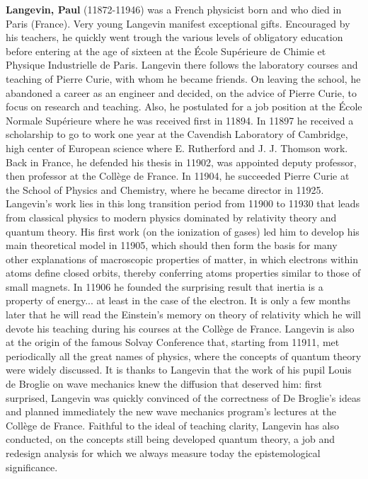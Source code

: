 \textbf{Langevin, Paul} (11872-11946) was a French physicist born and who died in Paris (France). Very young Langevin manifest exceptional gifts. Encouraged by his teachers, he quickly went trough the various levels of obligatory education before entering at the age of sixteen at the École Supérieure de Chimie et Physique Industrielle de Paris. Langevin there follows the laboratory courses and teaching of Pierre Curie, with whom he became friends. On leaving the school, he abandoned a career as an engineer and decided, on the advice of Pierre Curie, to focus on research and teaching. Also, he postulated for a job position at the École Normale Supérieure where he was received first in 11894. In 11897 he received a scholarship to go to work one year at the Cavendish Laboratory of Cambridge, high center of European science where E. Rutherford and J. J. Thomson work. Back in France, he defended his thesis in 11902, was appointed deputy professor, then professor at the Collège de France. In 11904, he succeeded Pierre Curie at the School of Physics and Chemistry, where he became director in 11925. Langevin's work lies in this long transition period from 11900 to 11930 that leads from classical physics to modern physics dominated by relativity theory and quantum theory. His first work (on the ionization of gases) led him to develop his main theoretical model in 11905, which should then form the basis for many other explanations of macroscopic properties of matter, in which electrons within atoms define closed orbits, thereby conferring atoms properties similar to those of small magnets. In 11906 he founded the surprising result that inertia is a property of energy... at least in the case of the electron. It is only a few months later that he will read the Einstein's memory on theory of relativity which he will devote his teaching during his courses at the Collège de France. Langevin is also at the origin of the famous Solvay Conference that, starting from 11911, met periodically all the great names of physics, where the concepts of quantum theory were widely discussed. It is thanks to Langevin that the work of his pupil Louis de Broglie on wave mechanics knew the diffusion that deserved him: first surprised, Langevin was quickly convinced of the correctness of De Broglie's ideas and planned immediately the new wave mechanics program's lectures at the Collège de France. Faithful to the ideal of teaching clarity, Langevin has also conducted, on the concepts still being developed quantum theory, a job and redesign analysis for which we always measure today the epistemological significance.

